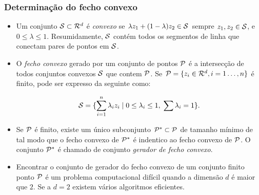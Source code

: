 \documentclass[12pt]{article}
\begin{document}
\subsubsection{Determinação do fecho convexo}
\begin{itemize}

\item Um conjunto ${\cal S} \subset {\cal R}^d$ é {\em convexo} se $\lambda
z_1 + (1-\lambda)z_2 \in {\cal S}$ sempre $z_1, z_2 \in{\cal S}$,
e $0 \le \lambda \le 1$. Resumidamente, ${\cal S}$ contém todos os segmentos de linha que conectam pares de pontos em ${\cal S}$.

\item O {\em fecho convexo} gerado por um conjunto de pontos ${\cal P}$ é
a intersecção de todos conjuntos convexos ${\cal S}$ que contem ${\cal P}$.
Se ${\cal P} = \{z_i\in{\cal R}^d, i=1\ldots, n\}$ é finito, pode ser expresso da seguinte como:

$${\cal S} = \{ \sum_{i=1}^n \lambda_i z_i \;|\; 0 \le \lambda_i \le
1, \; \sum \lambda_i = 1\}.$$

\begin{center}
\end{center}

\item Se ${\cal P}$ é finito, existe um único subconjunto ${\cal
P}^* \subset {\cal P}$ de tamanho mínimo de tal modo que o fecho convexo de
${\cal P}^*$ é indentico ao fecho convexo de ${\cal P}$.  O conjunto
${\cal P}^*$ é chamado de conjunto {\em gerador de fecho convexo}.

\item Encontrar o conjunto de gerador do fecho convexo de um conjunto finito ponto
${\cal P}$ é um problema computacional difícil quando a dimensão $d$
é maior que $2$.  Se a $d = 2$ existem vários algoritmos eficientes.
\end{itemize}
\end{document}
